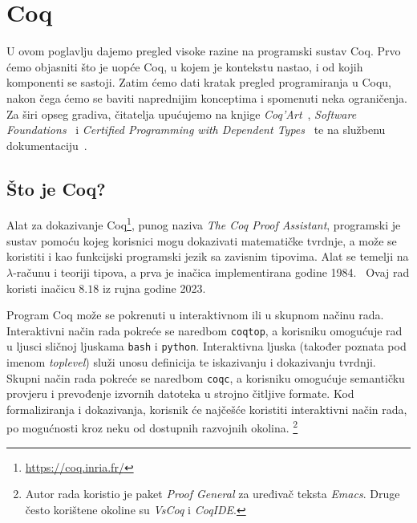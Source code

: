 \chapter{Coq}\label{pog:glavni_dio}
U ovom poglavlju dajemo pregled visoke razine na programski sustav Coq.
Prvo ćemo objasniti što je uopće Coq, u kojem je kontekstu nastao, i od kojih komponenti se sastoji.
Zatim ćemo dati kratak pregled programiranja u Coqu, nakon čega ćemo se baviti naprednijim konceptima i spomenuti neka ograničenja.
Za širi opseg gradiva, čitatelja upućujemo na knjige \textit{Coq'Art}~\cite{coqart}, \textit{Software Foundations}~\cite{sf-lf, sf-plf, sf-vfa} i \textit{Certified Programming with Dependent Types}~\cite{cpdt} te na službenu dokumentaciju~\cite{coqrefman}.

\section{Što je Coq?}\label{sec:osnovno-o-coqu}
Alat za dokazivanje Coq\footnote{\url{https://coq.inria.fr/}}, punog naziva \textit{The Coq Proof Assistant},
programski je sustav pomoću kojeg korisnici mogu dokazivati matematičke tvrdnje, a može se koristiti i kao funkcijski programski jezik sa zavisnim tipovima.
Alat se temelji na \(\lambda\)-računu i teoriji tipova, a prva je inačica implementirana godine 1984.~\cite{coqrefman}
Ovaj rad koristi inačicu \(8.18\) iz rujna godine 2023.

Program Coq može se pokrenuti u interaktivnom ili u skupnom načinu rada.
Interaktivni način rada pokreće se naredbom \texttt{coqtop}, a korisniku omogućuje rad u ljusci sličnoj ljuskama \texttt{bash} i \texttt{python}.
Interaktivna ljuska (također poznata pod imenom \textit{toplevel}) služi unosu definicija te iskazivanju i dokazivanju tvrdnji.
Skupni način rada pokreće se naredbom \texttt{coqc}, a korisniku omogućuje semantičku provjeru i prevođenje izvornih datoteka u strojno čitljive formate.
Kod formaliziranja i dokazivanja, korisnik će najčešće koristiti interaktivni način rada, po mogućnosti kroz neku od dostupnih razvojnih okolina.
\footnote{Autor rada koristio je paket \textit{Proof General} za uređivač teksta \textit{Emacs}. Druge često korištene okoline su \textit{VsCoq} i \textit{CoqIDE}.}

